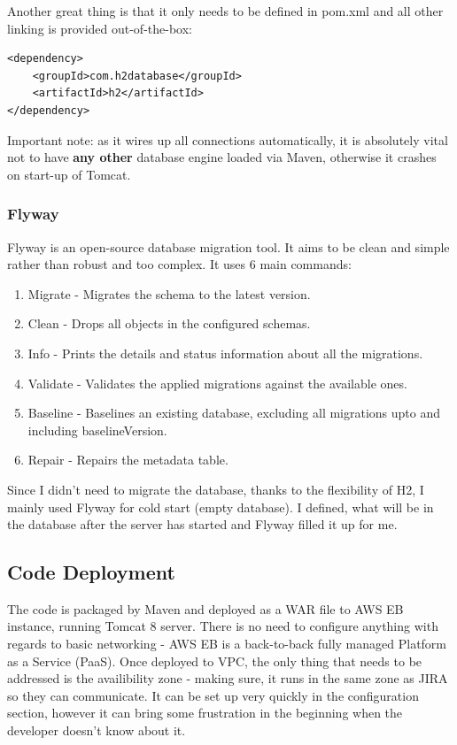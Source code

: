 Another great thing is that it only needs to be defined in pom.xml and all other linking is provided out-of-the-box:

\bigbreak

\begin{lstlisting}
<dependency>
    <groupId>com.h2database</groupId>
    <artifactId>h2</artifactId>
</dependency>
\end{lstlisting}

Important note: as it wires up all connections automatically, it is absolutely vital not to have {\bf any other} database engine loaded via Maven, otherwise it crashes on start-up of Tomcat.

\subsubsection{Flyway}

Flyway is an open-source database migration tool. It aims to be clean and simple rather than robust and too complex. It uses 6 main commands:

\begin{enumerate}
	\item Migrate - Migrates the schema to the latest version.
	\item Clean - Drops all objects in the configured schemas.
	\item Info - Prints the details and status information about all the migrations.
	\item Validate - Validates the applied migrations against the available ones.
	\item Baseline - Baselines an existing database, excluding all migrations upto and including baselineVersion.
	\item Repair - Repairs the metadata table.
\end{enumerate}

Since I didn't need to migrate the database, thanks to the flexibility of H2, I mainly used Flyway for cold start (empty database). I defined, what will be in the database after the server has started and Flyway filled it up for me.

\newpage

\subsection{Code Deployment}

The code is packaged by Maven and deployed as a WAR file to AWS EB instance, running Tomcat 8 server. There is no need to configure anything with regards to basic networking - AWS EB is a back-to-back fully managed Platform as a Service (PaaS). Once deployed to VPC, the only thing that needs to be addressed is the availibility zone - making sure, it runs in the same zone as JIRA so they can communicate. It can be set up very quickly in the configuration section, however it can bring some frustration in the beginning when the developer doesn't know about it.

